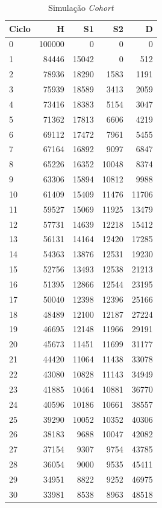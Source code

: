 \documentclass[12pt]{article}
\theoremstyle{break}
\begin{document}
\begin{table}[H]
\centering
\caption{Simulação \textit{Cohort}} 
\label{tab:cohort_no_trt}
\begin{tabular}{lrrrr}
  \hline
Ciclo & H & S1 & S2 & D \\ 
  \hline
0 & 100000 & 0 & 0 & 0 \\ 
1 & 84446 & 15042 & 0 & 512 \\ 
2 & 78936 & 18290 & 1583 & 1191 \\ 
3 & 75939 & 18589 & 3413 & 2059 \\ 
4 & 73416 & 18383 & 5154 & 3047 \\ 
5 & 71362 & 17813 & 6606 & 4219 \\ 
6 & 69112 & 17472 & 7961 & 5455 \\ 
7 & 67164 & 16892 & 9097 & 6847 \\ 
8 & 65226 & 16352 & 10048 & 8374 \\ 
9 & 63306 & 15894 & 10812 & 9988 \\ 
10 & 61409 & 15409 & 11476 & 11706 \\ 
11 & 59527 & 15069 & 11925 & 13479 \\ 
12 & 57731 & 14639 & 12218 & 15412 \\ 
13 & 56131 & 14164 & 12420 & 17285 \\ 
14 & 54363 & 13876 & 12531 & 19230 \\ 
15 & 52756 & 13493 & 12538 & 21213 \\ 
16 & 51395 & 12866 & 12544 & 23195 \\ 
17 & 50040 & 12398 & 12396 & 25166 \\ 
18 & 48489 & 12100 & 12187 & 27224 \\ 
19 & 46695 & 12148 & 11966 & 29191 \\ 
20 & 45673 & 11451 & 11699 & 31177 \\ 
21 & 44420 & 11064 & 11438 & 33078 \\ 
22 & 43080 & 10828 & 11143 & 34949 \\ 
23 & 41885 & 10464 & 10881 & 36770 \\ 
24 & 40596 & 10186 & 10661 & 38557 \\ 
25 & 39290 & 10052 & 10352 & 40306 \\ 
26 & 38183 & 9688 & 10047 & 42082 \\ 
27 & 37154 & 9307 & 9754 & 43785 \\ 
28 & 36054 & 9000 & 9535 & 45411 \\ 
29 & 34951 & 8822 & 9252 & 46975 \\ 
30 & 33981 & 8538 & 8963 & 48518 \\ 
   \hline
\end{tabular}
\end{table}
\end{document}
